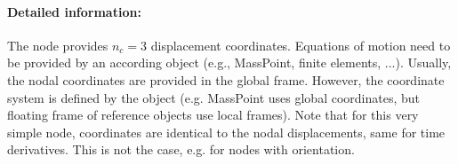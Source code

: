     \paragraph{Detailed information:}
    The node provides $n_c=3$ displacement coordinates. Equations of motion need to be provided by an according object (e.g., MassPoint, finite elements, ...).
    Usually, the nodal coordinates are provided in the global frame. However, the coordinate system is defined by the object (e.g. MassPoint uses global coordinates, but floating frame of reference objects use local frames).
    Note that for this very simple node, coordinates are identical to the nodal displacements, same for time derivatives. This is not the case, e.g. for nodes with orientation. \vspace{6pt}\\

